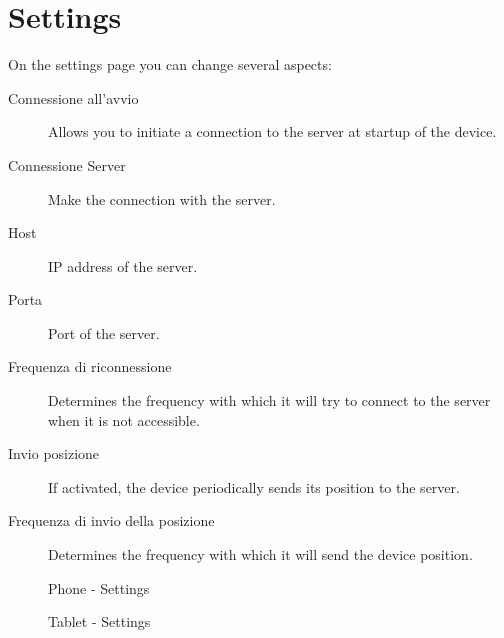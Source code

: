 


\chapter{Settings}
On the settings page you can change several aspects:
	\begin{description}

		\item[Connessione all'avvio]
		Allows you to initiate a connection to the server at startup of the device.

		\item[Connessione Server]
		Make the connection with the server.

		\item[Host]
		IP address of the server.

		\item[Porta]
		Port of the server.

		\item[Frequenza di riconnessione]
		Determines the frequency with which it will try to connect to the server when it is not accessible.

		\item[Invio posizione]
		If activated, the device periodically sends its position to the server.

		\item[Frequenza di invio della posizione]
		Determines the frequency with which it will send the device position.

	\end{description}



	\begin{figure}[h!]
		  \centering
		  \caption{Phone - Settings}
	\end{figure}

	\begin{figure}[h!]
		  \centering
		  \caption{Tablet - Settings}
	\end{figure}
